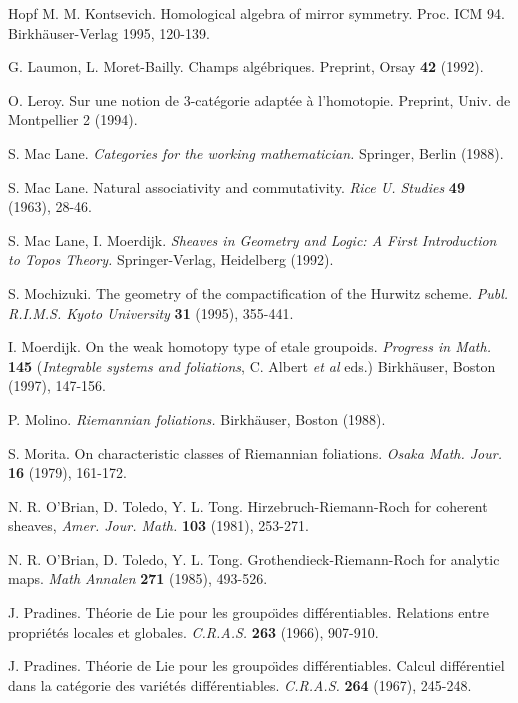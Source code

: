 \begin{thebibliography}{Hopf}
M. M. Kontsevich. Homological algebra of mirror symmetry. Proc. ICM 94.
Birkh\"auser-Verlag 1995, 120-139.

G. Laumon, L. Moret-Bailly. Champs alg\'ebriques. Preprint, Orsay {\bf 42}
(1992).

O. Leroy.  Sur une notion de $3$-cat\'egorie adapt\'ee \`a l'homotopie.
Preprint, Univ. de Montpellier 2 (1994).

S. Mac Lane. {\em Categories for the working mathematician.}
Springer, Berlin (1988).

S. Mac Lane. Natural associativity and commutativity. {\em Rice U. Studies}
{\bf 49} (1963), 28-46.

S. Mac Lane, I. Moerdijk. {\em Sheaves in Geometry and Logic: A First
Introduction to Topos Theory.} Springer-Verlag, Heidelberg (1992).

S. Mochizuki.  The geometry of the compactification  of the Hurwitz scheme.
{\em Publ. R.I.M.S. Kyoto University} {\bf 31} (1995), 355-441.

I. Moerdijk. On the weak homotopy type of etale groupoids. {\em Progress
in Math.} {\bf 145}
({\em Integrable systems and foliations}, C. Albert {\em et al} eds.)
Birkh\"auser, Boston (1997),
147-156.

P. Molino. {\em Riemannian foliations.} Birkh\"auser, Boston (1988).

S. Morita. On characteristic classes of Riemannian foliations. {\em
Osaka Math. Jour.} {\bf 16} (1979), 161-172.

N. R. O'Brian, D. Toledo, Y. L. Tong.  Hirzebruch-Riemann-Roch for
coherent sheaves, {\em Amer. Jour. Math.} {\bf  103} (1981),  253-271.

N. R. O'Brian, D. Toledo,  Y. L. Tong. Grothendieck-Riemann-Roch for
analytic maps.  {\em Math Annalen} {\bf  271} (1985), 493-526.

J. Pradines. Th\'eorie de Lie pour les groupo\"{\i}des
diff\'erentiables. Relations entre propri\'et\'es locales et globales.
{\em C.R.A.S.} {\bf 263} (1966), 907-910.

J. Pradines. Th\'eorie de Lie pour les groupo\"{\i}des
diff\'erentiables. Calcul diff\'erentiel dans la cat\'egorie des
vari\'et\'es diff\'erentiables. {\em C.R.A.S.} {\bf 264} (1967),
245-248.


\end{thebibliography}

